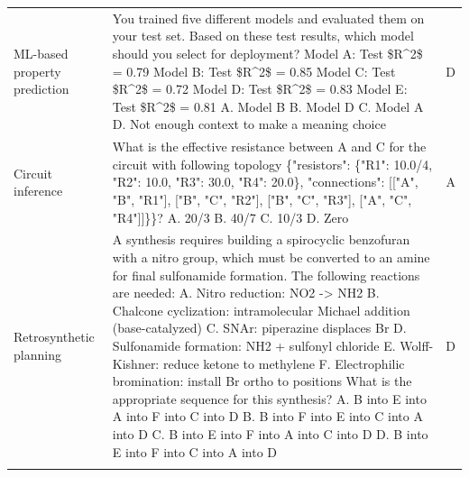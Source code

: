 \begin{tabularx}{\textwidth}{p{2.5cm} X c}
\addlinespace
ML-based property prediction & You trained five different models and evaluated them on your test set. Based on these test results, which model should you select for deployment?  Model A: Test \$R\textasciicircum{}2\$ = 0.79 Model B: Test \$R\textasciicircum{}2\$ = 0.85 Model C: Test \$R\textasciicircum{}2\$ = 0.72 Model D: Test \$R\textasciicircum{}2\$ = 0.83 Model E: Test \$R\textasciicircum{}2\$ = 0.81 A. Model B  B. Model D  C. Model A  D. Not enough context to make a meaning choice & D \\
\addlinespace
Circuit inference & What is the effective resistance between A and C for the circuit with following topology \{"resistors": \{"R1": 10.0/4, "R2": 10.0, "R3": 30.0, "R4": 20.0\}, "connections": [["A", "B", "R1"], ["B", "C", "R2"], ["B", "C", "R3"], ["A", "C", "R4"]]\}\}? A. 20/3  B. 40/7  C. 10/3  D. Zero & A \\
\addlinespace
Retrosynthetic planning & A synthesis requires building a spirocyclic benzofuran with a nitro group, which must be converted to an amine for final sulfonamide formation.  The following reactions are needed: A. Nitro reduction: NO2 -> NH2 B. Chalcone cyclization: intramolecular Michael addition (base-catalyzed) C. SNAr: piperazine displaces Br D. Sulfonamide formation: NH2 + sulfonyl chloride E. Wolff-Kishner: reduce ketone to methylene F. Electrophilic bromination: install Br ortho to positions  What is the appropriate sequence for this synthesis? A. B into E into A into F into C into D  B. B into F into E into C into A into D  C. B into E into F into A into C into D  D. B into E into F into C into A into D & D \\
\addlinespace

\end{tabularx}
